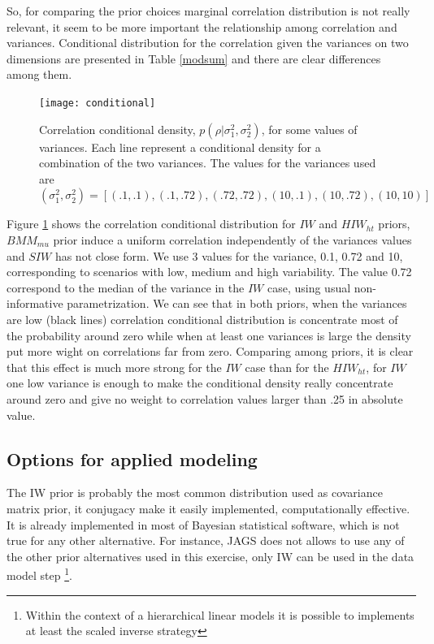 \documentclass{article}
\begin{document}
So, for comparing the prior choices marginal correlation distribution is not really relevant, it seem to be more important the relationship among correlation and variances. Conditional distribution for the correlation given the variances on two dimensions are presented in Table \ref{modsum} and there are clear differences among them. 

\begin{figure}[htbp]
\begin{center}
 \texttt{[image: conditional]} 
 \vspace{-.5in}
\caption{Correlation conditional density, $p(\rho\vert \sigma_1^2, \sigma_2^2)$, for some values of variances. Each line represent a conditional density for a combination of the two variances. The values for the variances used are $(\sigma_1^2, \sigma_2^2) = [(.1,.1), (.1, .72), (.72,.72), (10, .1), (10, .72), (10, 10) ] $ \label{condo}}
\end{center}
\end{figure}

Figure \ref{condo} shows the correlation conditional distribution for $IW$ and $HIW_{ht}$ priors, $BMM_{mu}$ prior induce a uniform correlation independently of the variances values and $SIW$ has not close form. We use 3 values for the variance, 0.1, 0.72 and 10, corresponding to scenarios with low, medium and high variability. The value 0.72 correspond to the median of the variance in the $IW$ case, using usual non-informative parametrization.  We can see that in both priors, when the variances are low (black lines) correlation conditional distribution is concentrate most of the probability around zero while when at least one variances is large the density put more wight on correlations far from zero.  Comparing among priors, it is clear that this effect is much more strong for the $IW$ case than for the $HIW_{ht}$, for $IW$  one low variance is enough to make the conditional density really concentrate around zero and give no weight to correlation values  larger than .25 in absolute value. 
 
\subsection{Options for applied modeling}

The IW prior is probably the most common distribution used as covariance matrix prior, it conjugacy make it easily implemented, computationally effective. It is already implemented in most of Bayesian statistical software, which is not true for any other alternative. For instance, JAGS does not allows to use any of the other prior alternatives used in this exercise, only IW can be used in the data model step \footnote{Within the context of a hierarchical linear models it is possible to implements at least the scaled inverse strategy}.  
\end{document}
